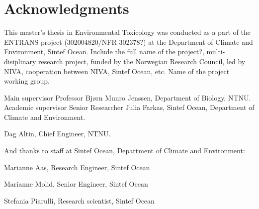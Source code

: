 \chapter*{Acknowledgments}
This master's thesis in Environmental Toxicology was conducted as a part of the ENTRANS project (302004820/NFR 302378?) at the Department of Climate and Environment, Sintef Ocean. Include the full name of the project?, multi-disiplinary research project, funded by the Norwegian Research Council, led by NIVA, cooperation between NIVA, Sintef Ocean, etc. Name of the project working group.

Main supervisor Professor Bjørn Munro Jenssen, Department of Biology, NTNU. \newline
Academic supervisor Senior Researcher Julia Farkas, Sintef Ocean, Department of Climate and Environment. \newline

Dag Altin, Chief Engineer, NTNU. \newline

And thanks to staff at Sintef Ocean, Department of Climate and Environment:

Marianne Aas, Research Engineer,  Sintef Ocean \newline

Marianne Molid, Senior Engineer, Sintef Ocean \newline

Stefania Piarulli, Research scientist, Sintef Ocean \newline




